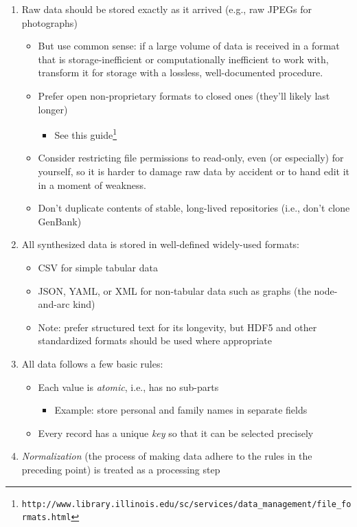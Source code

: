 \documentclass[10pt]{article}
\newcommand{\withurl}[2]{{#1}\footnote{\texttt{#2}}}
\begin{document}
\begin{enumerate}
\item
  Raw data should be stored exactly as it arrived (e.g., raw JPEGs for
  photographs)

  \begin{itemize}
  \item
    But use common sense: if a large volume of data is received in a
    format that is storage-inefficient or computationally inefficient to
    work with, transform it for storage with a lossless, well-documented
    procedure.
  \item
    Prefer open non-proprietary formats to closed ones (they'll likely
    last longer)

    \begin{itemize}
      \item
      See \withurl{this
        guide}{http://www.library.illinois.edu/sc/services/data\_management/file\_formats.html}
    \end{itemize}
  \item
    Consider restricting file permissions to read-only, even (or
    especially) for yourself, so it is harder to damage raw data by
    accident or to hand edit it in a moment of weakness.
  \item
    Don't duplicate contents of stable, long-lived repositories (i.e.,
    don't clone GenBank)
  \end{itemize}
\item
  All synthesized data is stored in well-defined widely-used formats:

  \begin{itemize}
  \item
    CSV for simple tabular data
  \item
    JSON, YAML, or XML for non-tabular data such as graphs (the
    node-and-arc kind)
  \item
    Note: prefer structured text for its longevity, but HDF5 and other
    standardized formats should be used where appropriate
  \end{itemize}
\item
  All data follows a few basic rules:

  \begin{itemize}
  \item
    Each value is \emph{atomic}, i.e., has no sub-parts

    \begin{itemize}
      \item
      Example: store personal and family names in separate fields
    \end{itemize}
  \item
    Every record has a unique \emph{key} so that it can be selected
    precisely
  \end{itemize}
\item
  \emph{Normalization} (the process of making data adhere to the rules
  in the preceding point) is treated as a processing step


\end{enumerate}
\end{document}
